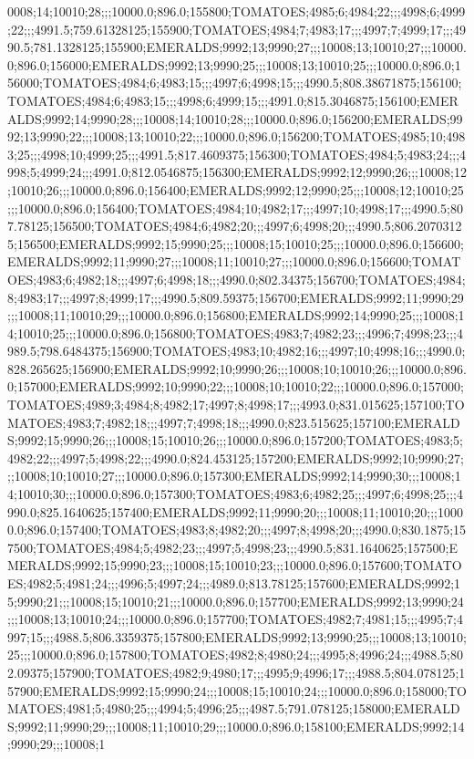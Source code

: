 0008;14;10010;28;;;10000.0;896.0;155800;TOMATOES;4985;6;4984;22;;;4998;6;4999;22;;;4991.5;759.61328125;155900;TOMATOES;4984;7;4983;17;;;4997;7;4999;17;;;4990.5;781.1328125;155900;EMERALDS;9992;13;9990;27;;;10008;13;10010;27;;;10000.0;896.0;156000;EMERALDS;9992;13;9990;25;;;10008;13;10010;25;;;10000.0;896.0;156000;TOMATOES;4984;6;4983;15;;;4997;6;4998;15;;;4990.5;808.38671875;156100;TOMATOES;4984;6;4983;15;;;4998;6;4999;15;;;4991.0;815.3046875;156100;EMERALDS;9992;14;9990;28;;;10008;14;10010;28;;;10000.0;896.0;156200;EMERALDS;9992;13;9990;22;;;10008;13;10010;22;;;10000.0;896.0;156200;TOMATOES;4985;10;4983;25;;;4998;10;4999;25;;;4991.5;817.4609375;156300;TOMATOES;4984;5;4983;24;;;4998;5;4999;24;;;4991.0;812.0546875;156300;EMERALDS;9992;12;9990;26;;;10008;12;10010;26;;;10000.0;896.0;156400;EMERALDS;9992;12;9990;25;;;10008;12;10010;25;;;10000.0;896.0;156400;TOMATOES;4984;10;4982;17;;;4997;10;4998;17;;;4990.5;807.78125;156500;TOMATOES;4984;6;4982;20;;;4997;6;4998;20;;;4990.5;806.20703125;156500;EMERALDS;9992;15;9990;25;;;10008;15;10010;25;;;10000.0;896.0;156600;EMERALDS;9992;11;9990;27;;;10008;11;10010;27;;;10000.0;896.0;156600;TOMATOES;4983;6;4982;18;;;4997;6;4998;18;;;4990.0;802.34375;156700;TOMATOES;4984;8;4983;17;;;4997;8;4999;17;;;4990.5;809.59375;156700;EMERALDS;9992;11;9990;29;;;10008;11;10010;29;;;10000.0;896.0;156800;EMERALDS;9992;14;9990;25;;;10008;14;10010;25;;;10000.0;896.0;156800;TOMATOES;4983;7;4982;23;;;4996;7;4998;23;;;4989.5;798.6484375;156900;TOMATOES;4983;10;4982;16;;;4997;10;4998;16;;;4990.0;828.265625;156900;EMERALDS;9992;10;9990;26;;;10008;10;10010;26;;;10000.0;896.0;157000;EMERALDS;9992;10;9990;22;;;10008;10;10010;22;;;10000.0;896.0;157000;TOMATOES;4989;3;4984;8;4982;17;4997;8;4998;17;;;4993.0;831.015625;157100;TOMATOES;4983;7;4982;18;;;4997;7;4998;18;;;4990.0;823.515625;157100;EMERALDS;9992;15;9990;26;;;10008;15;10010;26;;;10000.0;896.0;157200;TOMATOES;4983;5;4982;22;;;4997;5;4998;22;;;4990.0;824.453125;157200;EMERALDS;9992;10;9990;27;;;10008;10;10010;27;;;10000.0;896.0;157300;EMERALDS;9992;14;9990;30;;;10008;14;10010;30;;;10000.0;896.0;157300;TOMATOES;4983;6;4982;25;;;4997;6;4998;25;;;4990.0;825.1640625;157400;EMERALDS;9992;11;9990;20;;;10008;11;10010;20;;;10000.0;896.0;157400;TOMATOES;4983;8;4982;20;;;4997;8;4998;20;;;4990.0;830.1875;157500;TOMATOES;4984;5;4982;23;;;4997;5;4998;23;;;4990.5;831.1640625;157500;EMERALDS;9992;15;9990;23;;;10008;15;10010;23;;;10000.0;896.0;157600;TOMATOES;4982;5;4981;24;;;4996;5;4997;24;;;4989.0;813.78125;157600;EMERALDS;9992;15;9990;21;;;10008;15;10010;21;;;10000.0;896.0;157700;EMERALDS;9992;13;9990;24;;;10008;13;10010;24;;;10000.0;896.0;157700;TOMATOES;4982;7;4981;15;;;4995;7;4997;15;;;4988.5;806.3359375;157800;EMERALDS;9992;13;9990;25;;;10008;13;10010;25;;;10000.0;896.0;157800;TOMATOES;4982;8;4980;24;;;4995;8;4996;24;;;4988.5;802.09375;157900;TOMATOES;4982;9;4980;17;;;4995;9;4996;17;;;4988.5;804.078125;157900;EMERALDS;9992;15;9990;24;;;10008;15;10010;24;;;10000.0;896.0;158000;TOMATOES;4981;5;4980;25;;;4994;5;4996;25;;;4987.5;791.078125;158000;EMERALDS;9992;11;9990;29;;;10008;11;10010;29;;;10000.0;896.0;158100;EMERALDS;9992;14;9990;29;;;10008;1